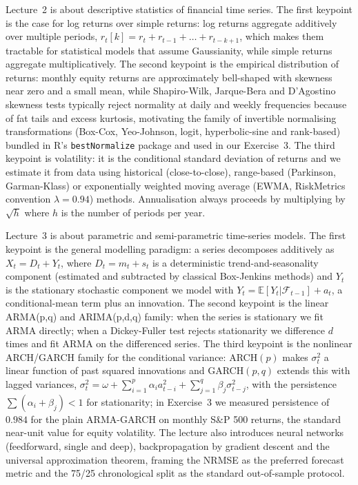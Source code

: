 \documentclass[12pt,a4paper]{article}
\newcommand{\code}[1]{\texttt{#1}}
\begin{document}
Lecture~2 is about descriptive statistics of financial time series. The first keypoint is the case for log returns over simple returns: log returns aggregate additively over multiple periods, $r_t[k] = r_t + r_{t-1} + \dots + r_{t-k+1}$, which makes them tractable for statistical models that assume Gaussianity, while simple returns aggregate multiplicatively. The second keypoint is the empirical distribution of returns: monthly equity returns are approximately bell-shaped with skewness near zero and a small mean, while Shapiro-Wilk, Jarque-Bera and D'Agostino skewness tests typically reject normality at daily and weekly frequencies because of fat tails and excess kurtosis, motivating the family of invertible normalising transformations (Box-Cox, Yeo-Johnson, logit, hyperbolic-sine and rank-based) bundled in R's \code{bestNormalize} package and used in our Exercise~3. The third keypoint is volatility: it is the conditional standard deviation of returns and we estimate it from data using historical (close-to-close), range-based (Parkinson, Garman-Klass) or exponentially weighted moving average (EWMA, RiskMetrics convention $\lambda = 0.94$) methods. Annualisation always proceeds by multiplying by $\sqrt{h}$ where $h$ is the number of periods per year.

Lecture~3 is about parametric and semi-parametric time-series models. The first keypoint is the general modelling paradigm: a series decomposes additively as $X_t = D_t + Y_t$, where $D_t = m_t + s_t$ is a deterministic trend-and-seasonality component (estimated and subtracted by classical Box-Jenkins methods) and $Y_t$ is the stationary stochastic component we model with $Y_t = \mathbb{E}[Y_t | \mathcal{F}_{t-1}] + a_t$, a conditional-mean term plus an innovation. The second keypoint is the linear ARMA(p,q) and ARIMA(p,d,q) family: when the series is stationary we fit ARMA directly; when a Dickey-Fuller test rejects stationarity we difference $d$ times and fit ARMA on the differenced series. The third keypoint is the nonlinear ARCH/GARCH family for the conditional variance: ARCH$(p)$ makes $\sigma_t^2$ a linear function of past squared innovations and GARCH$(p,q)$ extends this with lagged variances, $\sigma_t^2 = \omega + \sum_{i=1}^p \alpha_i a_{t-i}^2 + \sum_{j=1}^q \beta_j \sigma_{t-j}^2$, with the persistence $\sum (\alpha_i + \beta_j) < 1$ for stationarity; in Exercise~3 we measured persistence of $0.984$ for the plain ARMA-GARCH on monthly S\&P 500 returns, the standard near-unit value for equity volatility. The lecture also introduces neural networks (feedforward, single and deep), backpropagation by gradient descent and the universal approximation theorem, framing the NRMSE as the preferred forecast metric and the 75/25 chronological split as the standard out-of-sample protocol.
\end{document}
